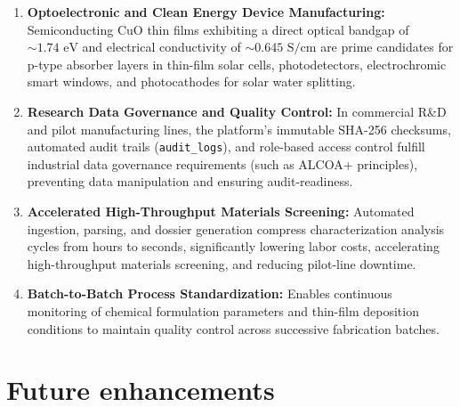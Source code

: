 \documentclass[12pt,a4paper,oneside]{report}
\begin{document}
{{{\begin{enumerate}
    \item \textbf{Optoelectronic and Clean Energy Device Manufacturing:} Semiconducting $\text{CuO}$ thin films exhibiting a direct optical bandgap of $\sim 1.74\text{ eV}$ and electrical conductivity of $\sim 0.645\text{ S/cm}$ are prime candidates for p-type absorber layers in thin-film solar cells, photodetectors, electrochromic smart windows, and photocathodes for solar water splitting.
    \item \textbf{Research Data Governance and Quality Control:} In commercial R\&D and pilot manufacturing lines, the platform's immutable SHA-256 checksums, automated audit trails (\texttt{audit\_logs}), and role-based access control fulfill industrial data governance requirements (such as ALCOA+ principles), preventing data manipulation and ensuring audit-readiness.
    \item \textbf{Accelerated High-Throughput Materials Screening:} Automated ingestion, parsing, and dossier generation compress characterization analysis cycles from hours to seconds, significantly lowering labor costs, accelerating high-throughput materials screening, and reducing pilot-line downtime.
    \item \textbf{Batch-to-Batch Process Standardization:} Enables continuous monitoring of chemical formulation parameters and thin-film deposition conditions to maintain quality control across successive fabrication batches.
\end{enumerate}

\section{Future enhancements}

}}}
\end{document}
